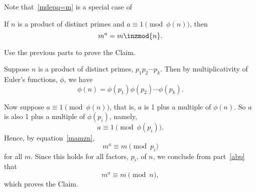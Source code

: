 \begin{problem}
\ppart Note that~\eqref{mdepq=m} is a special case of
\begin{claim*}
If $n$ is a product of distinct primes and $a \equiv 1
\pmod{\phi(n)}$, then
\[
m^a = m \inzmod{n}.
\]
\end{claim*}
Use the previous parts to prove the Claim.

\begin{solution}
Suppose $n$ is a product of distinct primes,
  $p_1p_2\cdots p_k$.  Then by multiplicativity of Euler's functions,
  $\phi$, we have
\[
\phi(n) = \phi(p_1)\phi(p_2)\cdots \phi(p_k).
\]

Now suppose $a \equiv 1 \pmod{\phi(n)}$, that is, $a$ is 1 plus a
multiple of $\phi(n)$.   So $a$ is also 1 plus a multiple of $\phi(p_i)$, namely,
\[
a \equiv 1 \pmod {\phi(p_i)}.
\]
Hence, by equation~\eqref{mamzn},
\[
m^a \equiv m \pmod{p_i}
\]
for all $m$.  Since this holds for all factors, $p_i$, of $n$, we conclude
from part~\eqref{abp} that
\[
m^a \equiv m \pmod{n},
\]
which proves the Claim.
\end{solution}

\eparts
\end{problem}



\endinput
